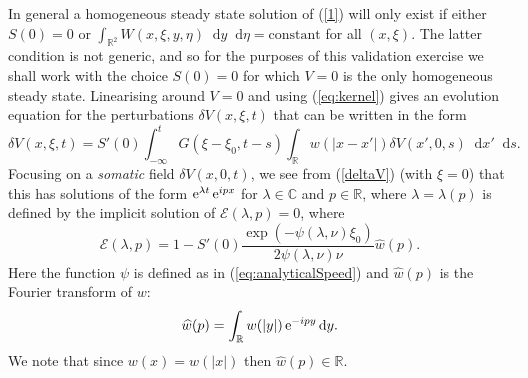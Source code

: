 \documentclass[a4paper,final]{siamart190516}
\newcommand{\Cb}{\mathbb{C}}
\newcommand{\Rb}{\mathbb{R}}
\newcommand{\diff}{\mathop{}\!\mathrm{d}}
\begin{document}
In general a homogeneous steady state solution of (\ref{1}) will only exist if either
$S(0)=0$ or $\int_{\Rb^2} W(x,\xi,y,\eta)\diff y \diff \eta = \text{constant}$
for all $(x,\xi)$.  The latter condition is not generic, and so for the purposes of
this validation exercise we shall work with the choice $S(0)=0$ for which $V=0$ is
the only homogeneous steady state.  Linearising around $V=0$ and using
(\ref{eq:kernel}) gives an evolution equation for the perturbations $\delta
V(x,\xi,t)$ that can be written in the form
\begin{equation}
\delta V(x,\xi,t) = S'(0) \int_{-\infty}^t G(\xi-\xi_0,t-s) \int_{\Rb} 
w(|x-x'|) \delta V(x',0,s) \diff x' \diff s.
\label{deltaV}
\end{equation}
Focusing on a \textit{somatic} field $\delta V(x,0,t)$, we see from (\ref{deltaV})
(with $\xi=0$) that this has solutions of the form $\operatorname{e}^{\lambda t} \operatorname{e}^{i p x}$ for
$\lambda \in \Cb$ and $p \in \Rb$, where $\lambda=\lambda(p)$ is defined by the
implicit solution of $\mathcal{E}(\lambda,p)=0$, where
\begin{equation}
\mathcal{E}(\lambda,p) = 1 - S'(0) \frac{\exp(-\psi(\lambda,\nu) \xi_0 )}{2 \psi(\lambda,\nu) \nu} \widehat{w}(p) .
\end{equation}
Here the function $\psi$ is defined as in (\ref{eq:analyticalSpeed}) and
$\widehat{w}(p)$ is the Fourier transform of $w$:
\begin{equation}
\widehat{w}(p) = \int_{\Rb}  w(|y|) \e^{-i p y} \diff y.
\end{equation}
We note that since $w(x)=w(|x|)$ then $\widehat{w}(p) \in \Rb$.  
\end{document}
